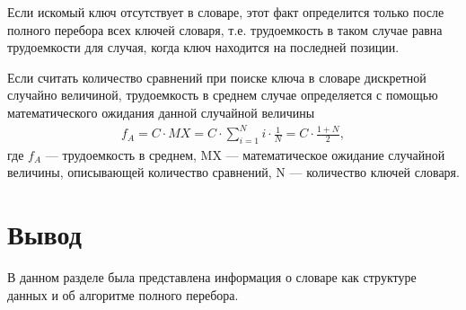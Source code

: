 Если искомый ключ отсутствует в словаре, этот факт определится только после полного перебора всех ключей словаря, т.е. трудоемкость в таком случае равна трудоемкости для случая, когда ключ находится на последней позиции.

Если считать количество сравнений при поиске ключа в словаре дискретной случайно величиной, трудоемкость в среднем случае определяется с помощью математического ожидания данной случайной величины
\begin{equation}
	\label{mx}
	\begin{aligned}
		f_A = C \cdot MX = C \cdot \sum_{i=1}^N i \cdot \frac{1}{N} = C \cdot \frac{1 + N}{2},
	\end{aligned}
\end{equation}
где $f_A$ --- трудоемкость в среднем, MX --- математическое ожидание случайной величины, описывающей количество сравнений, N --- количество ключей словаря.
\section*{Вывод}
В данном разделе была представлена информация о словаре как структуре данных и об алгоритме полного перебора.